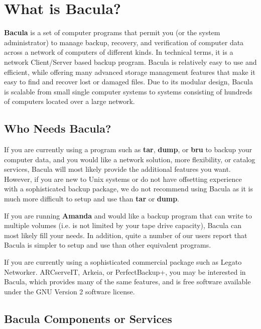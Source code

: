 
\section*{What is Bacula?}
\label{_ChapterStart41}

{\bf Bacula} is a set of computer programs that permit you (or the system
administrator) to manage backup, recovery, and verification of computer data
across a network of computers of different kinds. In technical terms, it is a
network Client/Server based backup program. Bacula is relatively easy to use
and efficient, while offering many advanced storage management features that
make it easy to find and recover lost or damaged files. Due to its modular
design, Bacula is scalable from small single computer systems to systems
consisting of hundreds of computers located over a large network. 

\subsection*{Who Needs Bacula?}

If you are currently using a program such as {\bf tar}, {\bf dump}, or {\bf
bru} to backup your computer data, and you would like a network solution, more
flexibility, or catalog services, Bacula will most likely provide the
additional features you want. However, if you are new to Unix systems or do
not have offsetting experience with a sophisticated backup package, we do not
recommend using Bacula as it is much more difficult to setup and use than {\bf
tar} or {\bf dump}. 

If you are running {\bf Amanda} and would like a backup program that can write
to multiple volumes (i.e. is not limited by your tape drive capacity), Bacula
can most likely fill your needs. In addition, quite a number of our users
report that Bacula is simpler to setup and use than other equivalent programs.


If you are currently using a sophisticated commercial package such as Legato
Networker. ARCserveIT, Arkeia, or PerfectBackup+, you may be interested in
Bacula, which provides many of the same features, and is free software
available under the GNU Version 2 software license. 

\subsection*{Bacula Components or Services}

